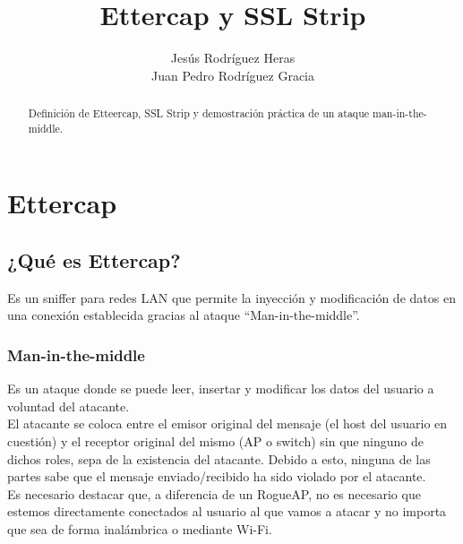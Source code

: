 \documentclass[12pt,letterpaper]{article}
\title{Ettercap y SSL Strip}
\author{Jesús Rodríguez Heras\\Juan Pedro Rodríguez Gracia}
\begin{document}
	
	\maketitle
	\begin{abstract} %
		\begin{center}
			Definición de Etteercap, SSL Strip y demostración práctica de un ataque man-in-the-middle.
		\end{center}
	\end{abstract}
	\thispagestyle{empty}
	\newpage
	
	\tableofcontents
	\newpage
	
	
	
	
	\lstset{language=bash, numbers=left, numberstyle=\tiny, numbersep=10pt, firstnumber=1, stepnumber=1, basicstyle=\small\ttfamily, tabsize=1, extendedchars=true, inputencoding=latin1}


\section{Ettercap}
\subsection{¿Qué es Ettercap?}
Es un sniffer para redes LAN que permite la inyección y modificación de datos en una conexión establecida gracias al ataque ``Man-in-the-middle''.

\subsubsection{Man-in-the-middle}
Es un ataque donde se puede leer, insertar y modificar los datos del usuario a voluntad del atacante.\\

El atacante se coloca entre el emisor original del mensaje (el host del usuario en cuestión) y el receptor original del mismo (AP o switch) sin que ninguno de dichos roles, sepa de la existencia del atacante. Debido a esto, ninguna de las partes sabe que el mensaje enviado/recibido ha sido violado por el atacante.\\

Es necesario destacar que, a diferencia de un RogueAP, no es necesario que estemos directamente conectados al usuario al que vamos a atacar y no importa que sea de forma inalámbrica o mediante Wi-Fi.
\end{document}
